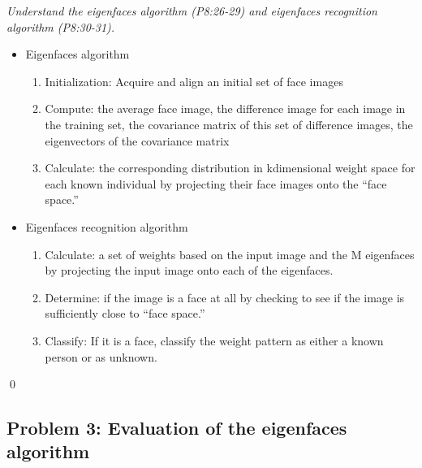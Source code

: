 \documentclass[
        ]{beamer}
\begin{document}
    		\begin{frame}[t]{\subsecname}
    			\begin{overprint}
    			\emph{Understand the eigenfaces algorithm (P8:26-29) and eigenfaces recognition algorithm (P8:30-31).}
    				\onslide<2> 
    				\onslide<3> 
    				\onslide<4> 
    				\onslide<5> 
    				\onslide<6> 
    				\onslide<7>  
    				\onslide<8>  
    				\begin{itemize}
    					\item Eigenfaces algorithm   				
    					\begin{enumerate}
								\item Initialization: Acquire and align an initial set of face images
								\item Compute: the average face image, the difference image for each image in the training set, the covariance matrix of this set of difference images, the eigenvectors of the covariance matrix
								\item Calculate: the corresponding distribution in kdimensional weight space for each known individual by
projecting their face images onto the ``face space.''
							\end{enumerate}
    				\end{itemize}
    				\begin{itemize}
							\item Eigenfaces recognition algorithm			
    					\begin{enumerate}
								\item Calculate: a set of weights based on the input image and the M eigenfaces by projecting the input image onto each of the
eigenfaces.
								\item Determine: if the image is a face at all by checking to see if the image is sufficiently close to ``face space.''
								\item Classify: If it is a face, classify the weight pattern as either a known person or as unknown.
							\end{enumerate}
    				\end{itemize}\qed
    			\end{overprint}
    		\end{frame}
    		
    \subsection{Problem 3: Evaluation of the eigenfaces algorithm}
    
\end{document}
